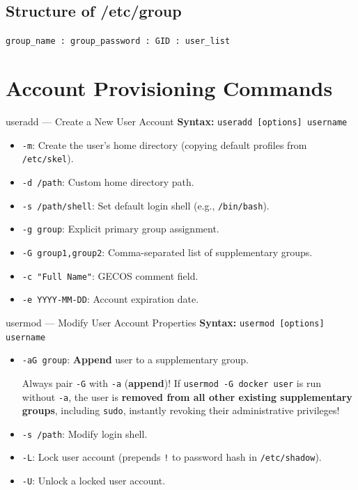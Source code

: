 \subsection{Structure of /etc/group}
\begin{center}
\texttt{group\_name : group\_password : GID : user\_list}
\end{center}

\section{Account Provisioning Commands}
\begin{commandbox}{useradd --- Create a New User Account}
\textbf{Syntax:} \texttt{useradd [options] username}
\begin{itemize}[leftmargin=1.5em]
    \item \texttt{-m}: Create the user's home directory (copying default profiles from \texttt{/etc/skel}).
    \item \texttt{-d /path}: Custom home directory path.
    \item \texttt{-s /path/shell}: Set default login shell (e.g., \texttt{/bin/bash}).
    \item \texttt{-g group}: Explicit primary group assignment.
    \item \texttt{-G group1,group2}: Comma-separated list of supplementary groups.
    \item \texttt{-c "Full Name"}: GECOS comment field.
    \item \texttt{-e YYYY-MM-DD}: Account expiration date.
\end{itemize}
\end{commandbox}

\begin{commandbox}{usermod --- Modify User Account Properties}
\textbf{Syntax:} \texttt{usermod [options] username}
\begin{itemize}[leftmargin=1.5em]
    \item \texttt{-aG group}: \textbf{Append} user to a supplementary group.
    \begin{warningbox}
    Always pair \texttt{-G} with \texttt{-a} (\textbf{append})! If \texttt{usermod -G docker user} is run without \texttt{-a}, the user is \textbf{removed from all other existing supplementary groups}, including \texttt{sudo}, instantly revoking their administrative privileges!
    \end{warningbox}
    \item \texttt{-s /path}: Modify login shell.
    \item \texttt{-L}: Lock user account (prepends \texttt{!} to password hash in \texttt{/etc/shadow}).
    \item \texttt{-U}: Unlock a locked user account.
\end{itemize}
\end{commandbox}


